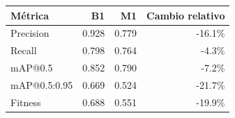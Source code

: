 \begin{tabular}{lrrr}
\toprule
Métrica & B1 & M1 & Cambio relativo \\
\midrule
Precision & 0.928 & 0.779 & -16.1\% \\
Recall & 0.798 & 0.764 & -4.3\% \\
mAP@0.5 & 0.852 & 0.790 & -7.2\% \\
mAP@0.5:0.95 & 0.669 & 0.524 & -21.7\% \\
Fitness & 0.688 & 0.551 & -19.9\% \\
\bottomrule
\end{tabular}
